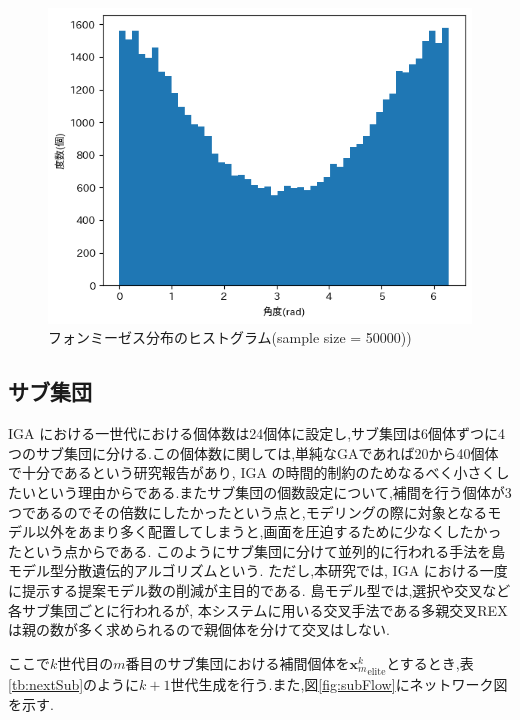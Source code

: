 \begin{figure}[h]
	\begin{center}
		\includegraphics[scale=0.55]{./imgs/vonMisesDis50000.png}
		\caption{フォンミーゼス分布のヒストグラム(sample size = 50000)\label{fig:vonMises50000})}
	\end{center}
\end{figure}
\newpage

\subsection{サブ集団}
IGA における一世代における個体数は24個体に設定し,サブ集団は6個体ずつに4つのサブ集団に分ける.この個体数に関しては,単純なGAであれば20から40個体で十分であるという研究報告\cite{grefenstette1986optimization}があり, IGA の時間的制約のためなるべく小さくしたいという理由からである.またサブ集団の個数設定について,補間を行う個体が3つであるのでその倍数にしたかったという点と,モデリングの際に対象となるモデル以外をあまり多く配置してしまうと,画面を圧迫するために少なくしたかったという点からである.
このようにサブ集団に分けて並列的に行われる手法を島モデル型分散遺伝的アルゴリズム\cite{tanese1989distributed}という.
ただし,本研究では, IGA における一度に提示する提案モデル数の削減が主目的である.
島モデル型では,選択や交叉など各サブ集団ごとに行われるが,
本システムに用いる交叉手法である多親交叉REXは親の数が多く求められるので親個体を分けて交叉はしない.


ここで$k$世代目の$m$番目のサブ集団における補間個体を${\bm{x}^k_m}_\mathrm{elite}$とするとき,表\ref{tb:nextSub}のように$k+1$世代生成を行う.また,図\ref{fig:subFlow}にネットワーク図を示す.

